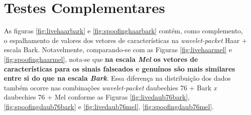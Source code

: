 	\section{Testes Complementares}
	\label{chap:testsResults:sec:Experimento05}
		As figuras \ref{fig:livehaarbark} e \ref{fig:spoofinghaarbark} contém, como complemento, o espalhamento de valores dos vetores de características na \textit{wavelet-packet} Haar + escala Bark. Notavelmente, comparando-se com as Figuras \ref{fig:livehaarmel} e \ref{fig:spoofinghaarmel}, nota-se que \textbf{na escala \textit{Mel} os vetores de características para os sinais falseados e genuínos são mais similares entre si do que na escala \textit{Bark}}. Essa diferença na distribuição dos dados também ocorre nas combinações  \textit{wavelet-packet} daubechies 76 + Bark \textit{x} daubechies 76 + Mel conforme as Figuras \ref{fig:livedaub76bark}, \ref{fig:spoofingdaub76bark} e \ref{fig:livedaub76mel}, \ref{fig:spoofingdaub76mel}.
		
